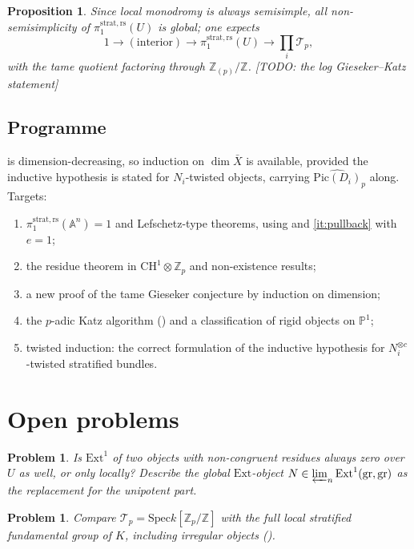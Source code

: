 \documentclass[11pt,reqno]{amsart}
\newcommand{\TODO}[1]{{\color{red}\textsf{[TODO: #1]}}}
\newcommand{\Zp}{\mathbb{Z}_p}
\newcommand{\ZZ}{\mathbb{Z}}
\newcommand{\PP}{\mathbb{P}}
\newcommand{\AAA}{\mathbb{A}}
\newcommand{\cT}{\mathcal{T}}
\newcommand{\rs}{\mathrm{rs}}
\newcommand{\strat}{\mathrm{strat}}
\newcommand{\Pic}{\mathrm{Pic}}
\newcommand{\Ext}{\mathrm{Ext}}
\newcommand{\Spec}{\mathrm{Spec}}
\newcommand{\gr}{\mathrm{gr}}
\theoremstyle{plain}
\newtheorem{proposition}[theorem]{Proposition}
\newtheorem{problem}[theorem]{Problem}
\theoremstyle{definition}
\theoremstyle{remark}
\numberwithin{equation}{section}
\begin{document}
\begin{proposition}
Since local monodromy is always semisimple, all non-semisimplicity of
$\pi_1^{\strat,\rs}(U)$ is global; one expects
\[
   1\to(\text{interior})\to\pi_1^{\strat,\rs}(U)\to\prod_i\cT_p,
\]
with the tame quotient factoring through $\ZZ_{(p)}/\ZZ$.
\TODO{the log Gieseker--Katz statement}
\end{proposition}

\subsection{Programme}
 is dimension-decreasing, so induction on
$\dim\bar X$ is available, provided the inductive hypothesis is stated for
$N_i$-twisted objects, carrying $\widehat{\Pic(D_i)}_p$ along.  Targets:
\begin{enumerate}
\item $\pi_1^{\strat,\rs}(\AAA^n)=1$ and Lefschetz-type theorems, using
       and
      \eqref{it:pullback} with $e=1$;
\item the residue theorem in $\mathrm{CH}^1\otimes\Zp$ and non-existence
      results;
\item a new proof of the tame Gieseker conjecture by induction on
      dimension;
\item the $p$-adic Katz algorithm () and a
      classification of rigid objects on $\PP^1$;
\item twisted induction: the correct formulation of the inductive
      hypothesis for $N_i^{\otimes c}$-twisted stratified bundles.
\end{enumerate}

\section{Open problems}

\begin{problem}
Is $\Ext^1$ of two objects with non-congruent residues always zero over
$U$ as well, or only locally?  Describe the global $\Ext$-object
$N\in\varprojlim_n\Ext^1(\gr,\gr)$ as the replacement for the unipotent
part.
\end{problem}

\begin{problem}
Compare $\cT_p=\Spec k[\Zp/\ZZ]$ with the full local stratified
fundamental group of $K$, including irregular objects
().
\end{problem}
\end{document}
